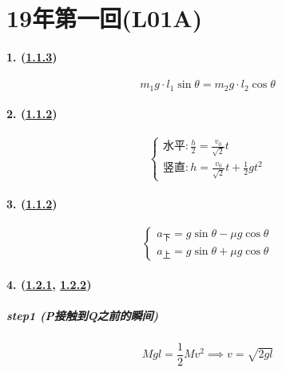 
\section{19年第一回(L01A)}

\paragraph{1. (\hyperref[subsec:1.1.3]{1.1.3})}

\begin{equation*}
    m_1g\cdot l_1\sin\theta=m_2g\cdot l_2\cos\theta
\end{equation*}

\paragraph{2. (\hyperref[subsec:1.1.2]{1.1.2})}

\begin{equation*}
    \begin{cases}
        \textrm{水平}:\frac{h}{2}=\frac{v_0}{\sqrt{2}}t\\
        \textrm{竖直}:h=\frac{v_0}{\sqrt{2}}t+\frac12gt^2
    \end{cases}
\end{equation*}

\paragraph{3. (\hyperref[subsec:1.1.2]{1.1.2})}

\begin{equation*}
    \begin{cases}
        a_\textrm{下}=g\sin\theta-\mu g\cos\theta\\
        a_\textrm{上}=g\sin\theta+\mu g\cos\theta
    \end{cases}
\end{equation*}

\paragraph{4. (\hyperref[subsec:1.2.1]{1.2.1}, \hyperref[subsec:1.2.2]{1.2.2})}

\subparagraph{step1 (P接触到Q之前的瞬间)}

\begin{equation*}
    Mgl=\frac12Mv^2\implies
    v=\sqrt{2gl}
\end{equation*}

